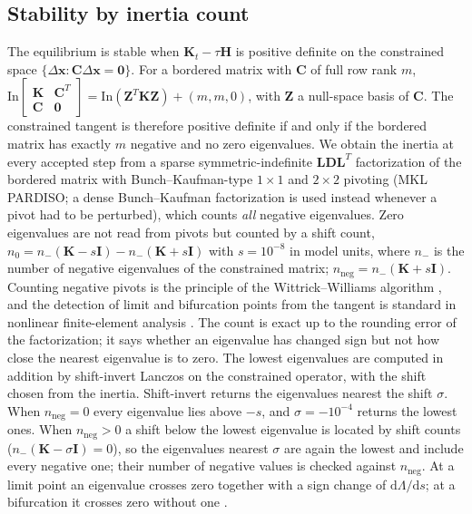 \documentclass[preprint,12pt,a4paper]{elsarticle}
\newcommand{\x}{\mathbf{x}}
\newcommand{\Kt}{\mathbf{K}_t}
\newcommand{\Hm}{\mathbf{H}}
\newcommand{\C}{\mathbf{C}}
\begin{document}
\subsection{Stability by inertia count}
\label{sec:inertia}
The equilibrium is stable when $\Kt-\tau\Hm$ is positive definite on the constrained space $\{\Delta\x:\C\Delta\x=\mathbf{0}\}$. For a bordered matrix with $\C$ of full row rank $m$, $\mathrm{In}\begin{bmatrix}\mathbf{K}&\C^T\\\C&\mathbf{0}\end{bmatrix}=\mathrm{In}(\mathbf{Z}^T\mathbf{K}\mathbf{Z})+(m,m,0)$, with $\mathbf{Z}$ a null-space basis of $\C$. The constrained tangent is therefore positive definite if and only if the bordered matrix has exactly $m$ negative and no zero eigenvalues. We obtain the inertia at every accepted step from a sparse symmetric-indefinite $\mathbf{L}\mathbf{D}\mathbf{L}^T$ factorization of the bordered matrix with Bunch--Kaufman-type $1\times1$ and $2\times2$ pivoting \citep{bunch1977} (MKL PARDISO; a dense Bunch--Kaufman factorization is used instead whenever a pivot had to be perturbed), which counts \emph{all} negative eigenvalues. Zero eigenvalues are not read from pivots but counted by a shift count, $n_0=n_-(\mathbf{K}-s\mathbf{I})-n_-(\mathbf{K}+s\mathbf{I})$ with $s=10^{-8}$ in model units, where $n_-$ is the number of negative eigenvalues of the constrained matrix; $n_{\mathrm{neg}}=n_-(\mathbf{K}+s\mathbf{I})$. Counting negative pivots is the principle of the Wittrick--Williams algorithm \citep{wittrick1971}, and the detection of limit and bifurcation points from the tangent is standard in nonlinear finite-element analysis \citep{wriggers1990}. The count is exact up to the rounding error of the factorization; it says whether an eigenvalue has changed sign but not how close the nearest eigenvalue is to zero. The lowest eigenvalues are computed in addition by shift-invert Lanczos on the constrained operator, with the shift chosen from the inertia. Shift-invert returns the eigenvalues nearest the shift $\sigma$. When $n_{\mathrm{neg}}=0$ every eigenvalue lies above $-s$, and $\sigma=-10^{-4}$ returns the lowest ones. When $n_{\mathrm{neg}}>0$ a shift below the lowest eigenvalue is located by shift counts ($n_-(\mathbf{K}-\sigma\mathbf{I})=0$), so the eigenvalues nearest $\sigma$ are again the lowest and include every negative one; their number of negative values is checked against $n_{\mathrm{neg}}$. At a limit point an eigenvalue crosses zero together with a sign change of $\mathrm{d}\Lambda/\mathrm{d}s$; at a bifurcation it crosses zero without one \citep{thompson1973}.
\end{document}
